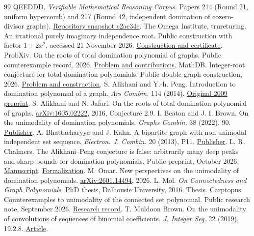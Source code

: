 \documentclass[11pt,a4paper]{article}
\begin{document}
\begin{thebibliography}{99}
 QEEDDD. \emph{Verifiable Mathematical Reasoning Corpus}. Papers 214 (Round 21, uniform hypercomb) and 217 (Round 42, independent domination of cozero-divisor graphs). \href{https://github.com/QEEDDD/Verifiable-Mathematical-Reasoning-Corpus/tree/c2ac34ea4622778187173f41bb1996deee8081b7}{Repository snapshot c2ac34e}.
 The Omega Institute, trureturing. An irrational purely imaginary independence root. Public construction with factor $1+2x^2$, accessed 21 November 2026. \href{https://www.trureturing.org/research/brown-cameron-2020-irrational-imaginary-independence-root/}{Construction and certificate}.
 ProbXiv. On the roots of total domination polynomial of graphs. Public counterexample record, 2026. \href{https://probxiv.com/problems/on-the-roots-of-total-domination-polynomial-of-graphs-2}{Problem and contributions}.
 MathDB. Integer-root conjecture for total domination polynomials. Public double-graph construction, 2026. \href{https://mathdb.com/p/333086/integer-root-conjecture-for-total-domination-polynomials}{Problem and construction}.
 S. Alikhani and Y.-h. Peng. Introduction to domination polynomial of a graph. \emph{Ars Combin.} 114 (2014). \href{https://arxiv.org/abs/0905.2251}{Original 2009 preprint}.
 S. Alikhani and N. Jafari. On the roots of total domination polynomial of graphs. \href{https://arxiv.org/abs/1605.02222}{arXiv:1605.02222}, 2016, Conjecture 2.9.
 I. Beaton and J. I. Brown. On the unimodality of domination polynomials. \emph{Graphs Combin.} 38 (2022), 90. \href{https://doi.org/10.1007/s00373-022-02487-x}{Publisher}.
 A. Bhattacharyya and J. Kahn. A bipartite graph with non-unimodal independent set sequence. \emph{Electron. J. Combin.} 20 (2013), P11. \href{https://doi.org/10.37236/3034}{Publisher}.
 L. R. Chalmers. The Alikhani--Peng conjecture is false: arbitrarily many deep peaks and sharp bounds for domination polynomials. Public preprint, October 2026. \href{https://doi.org/10.13140/RG.2.2.34268.76163}{Manuscript}. \href{https://doi.org/10.5281/zenodo.23092986}{Formalization}.
 M. Omar. New perspectives on the unimodality of domination polynomials. \href{https://arxiv.org/abs/2601.14494}{arXiv:2601.14494}, 2026.
 L. Mol. \emph{On Connectedness and Graph Polynomials}. PhD thesis, Dalhousie University, 2016. \href{https://hdl.handle.net/10222/71408}{Thesis}.
 Carptopus. Counterexamples to unimodality of the connected set polynomial. Public research note, September 2026. \href{https://doi.org/10.5281/zenodo.22250860}{Research record}.
 T. Muldoon Brown. On the unimodality of convolutions of sequences of binomial coefficients. \emph{J. Integer Seq.} 22 (2019), 19.2.8. \href{https://cs.uwaterloo.ca/journals/JIS/VOL22/Brown/brown4.html}{Article}.
\end{thebibliography}
\end{document}
